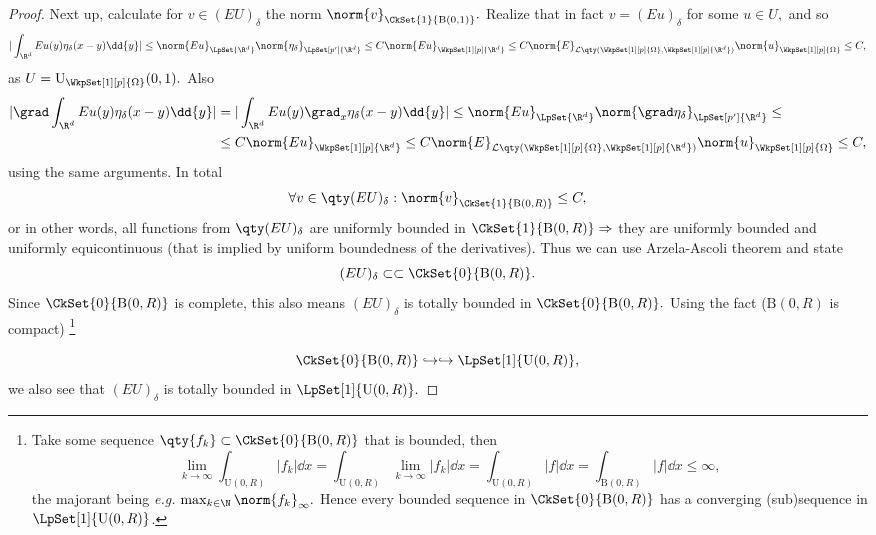 \begin{proof}
	Next up, calculate for $v \in (EU)_{\delta}$ the norm $\norm{v}_{\CkSet{1}{\text{B}(0,1)}}.$ Realize that in fact $v = (Eu)_{\delta}$ for some $u \in U,$ and so
	\[
		|\int_{\R^{d}}Eu(y) \eta_{\delta}(x-y)\dd{y}| \leq \norm{Eu}_{\LpSet{\R^{d}}}\norm{\eta_{\delta}}_{\LpSet[p']{\R^{d}}} \leq C \norm{Eu}_{\WkpSet[1][p]{\R^{d}}} \leq C \norm{E}_{\mathcal{L}\qty(\WkpSet[1][p]{\Omega}, \WkpSet[1][p]{\R^{d}})} \norm{u}_{\WkpSet[1][p]{\Omega}} \leq C,
	\]
	as $U = \text{U}_{\WkpSet[1][p]{\Omega}}(0,1).$ Also
	\begin{align*}
		|\grad \int_{\R^{d}}Eu(y) \eta_{\delta}(x-y)\dd{y}| &=|\int_{\R^{d}}Eu(y) \grad_x \eta_{\delta}(x-y)\dd{y}| \leq \norm{Eu}_{\LpSet{\R^{d}}} \norm{\grad \eta_{\delta}}_{\LpSet[p']{\R^{d}}} \leq \\
		&\leq C \norm{Eu}_{\WkpSet[1][p]{\R^{d}}} \leq C \norm{E}_{\mathcal{L}\qty(\WkpSet[1][p]{\Omega}, \WkpSet[1][p]{\R^{d}})} \norm{u}_{\WkpSet[1][p]{\Omega}} \leq C,
	\end{align*}
	using the same arguments. In total
	\[
		\forall v \in \qty(EU)_{\delta}: \norm{v}_{\CkSet{1}{\text{B}(0,R)}}\leq C,
	\]
	or in other words, all functions from $\qty(EU)_{\delta}$ are uniformly bounded in $\CkSet{1}{\text{B}(0,R)} \Rightarrow$ they are uniformly bounded and uniformly equicontinuous (that is implied by uniform boundedness of the derivatives). Thus we can use Arzela-Ascoli theorem and state
	\[
		(EU)_{\delta} \subset \subset \CkSet{0}{\text{B}(0,R)}.
	\]
	Since $\CkSet{0}{\text{B}(0,R)}$ is complete, this also means $(EU)_{\delta}$ is totally bounded in $\CkSet{0}{\text{B}(0,R)}.$ Using the fact ($\text{B}(0,R)$ is compact) \footnote{Take some sequence $\qty{f_k} \subset \CkSet{0}{\text{B}(0,R)}$ that is bounded, then
		\[
			\lim_{k \to \infty}\int_{\text{U}(0,R)}|f_k|\dd{x} = \int_{\text{U}(0,R)}\lim_{k \to \infty} |f_k|\dd{x} = \int_{\text{U}(0,R)}|f|\dd{x} = \int_{\text{B}(0,R)}|f|\dd{x} \leq \infty,
		\]
	the majorant being \textit{e.g.} $\max_{k \in \N}\norm{f_k}_{\infty}.$ Hence every bounded sequence in $\CkSet{0}{\text{B}(0,R)}$ has a converging (sub)sequence in $\LpSet[1]{\text{U}(0,R)}$.}
	
	\[
		\CkSet{0}{\text{B}(0,R)} \hookrightarrow \hookrightarrow \LpSet[1]{\text{U}(0,R)},
	\]
	we also see that $(EU)_{\delta}$ is totally bounded in $\LpSet[1]{\text{U}(0,R)}.$


\end{proof}
